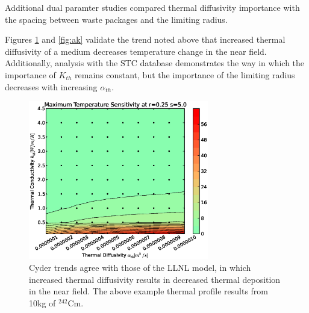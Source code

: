 Additional dual paramter studies compared thermal diffusivity importance with the spacing 
between waste packages and the limiting radius.  

Figures \ref{fig:ar} and \ref{fig:ak} validate the trend noted above that 
increased thermal diffusivity of a medium decreases temperature change 
in the near field.  Additionally, analysis with the \Cyder STC database 
demonstrates the way in which the importance of $K_{th}$ remains constant, but 
the importance of the limiting radius decreases with increasing $\alpha_{th}$.

\begin{figure}[htbp!]
\begin{center}
\includegraphics[width=0.7\textwidth]{./chapters/demonstration/diffusivity/ak.eps}
\end{center}
\caption[$\alpha_{th}$ vs. $K_{th}$ Sensitivity in Cyder]{Cyder trends agree
with those of the LLNL model, in which increased thermal diffusivity results in 
decreased thermal deposition in the near field. The above example thermal 
profile results from 10kg of $^{242}$Cm.} 
\label{fig:ar}
\end{figure}


